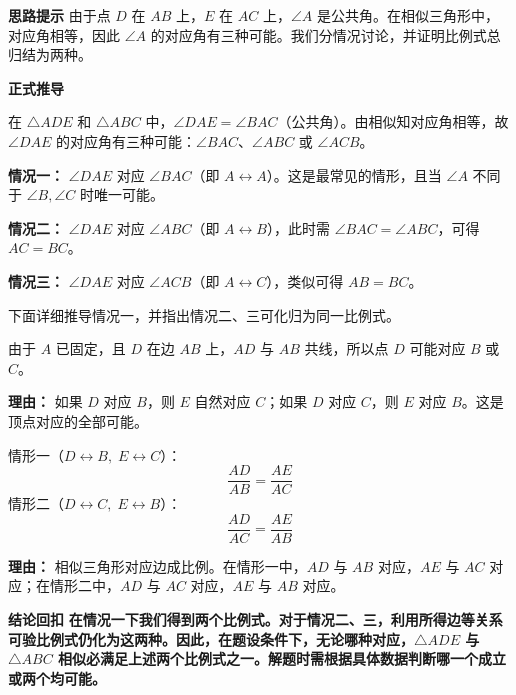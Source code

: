 \begin{proofbox}
	\textbf{\textcolor{CProof}{思路提示}}
	由于点 $D$ 在 $AB$ 上，$E$ 在 $AC$ 上，$\angle A$ 是公共角。在相似三角形中，对应角相等，因此 $\angle A$ 的对应角有三种可能。我们分情况讨论，并证明比例式总归结为两种。

	\medskip
	\textbf{\textcolor{CProof}{正式推导}}
	\begin{description}[style=nextline, leftmargin=2.8em, labelsep=0.5em, itemsep=0.55em]
		\item[\textbf{步骤一（对应角分析）：}]
			在 $\triangle ADE$ 和 $\triangle ABC$ 中，$\angle DAE = \angle BAC$（公共角）。由相似知对应角相等，故 $\angle DAE$ 的对应角有三种可能：$\angle BAC$、$\angle ABC$ 或 $\angle ACB$。
			\par\textbf{情况一：} $\angle DAE$ 对应 $\angle BAC$（即 $A\leftrightarrow A$）。这是最常见的情形，且当 $\angle A$ 不同于 $\angle B,\angle C$ 时唯一可能。
			\par\textbf{情况二：} $\angle DAE$ 对应 $\angle ABC$（即 $A\leftrightarrow B$），此时需 $\angle BAC = \angle ABC$，可得 $AC = BC$。
			\par\textbf{情况三：} $\angle DAE$ 对应 $\angle ACB$（即 $A\leftrightarrow C$），类似可得 $AB = BC$。 \par 下面详细推导情况一，并指出情况二、三可化归为同一比例式。
		\item[\textbf{步骤二（在情况一下分类点 $D$ 的对应）：}]
			由于 $A$ 已固定，且 $D$ 在边 $AB$ 上，$AD$ 与 $AB$ 共线，所以点 $D$ 可能对应 $B$ 或 $C$。
			\par\textbf{理由：} 如果 $D$ 对应 $B$，则 $E$ 自然对应 $C$；如果 $D$ 对应 $C$，则 $E$ 对应 $B$。这是顶点对应的全部可能。
		\item[\textbf{步骤三（列出比例式）：}]
			情形一（$D\leftrightarrow B,\;E\leftrightarrow C$）：
			\[
				\frac{AD}{AB} = \frac{AE}{AC}
			\]
			情形二（$D\leftrightarrow C,\;E\leftrightarrow B$）：
			\[
				\frac{AD}{AC} = \frac{AE}{AB}
			\]
			\par\textbf{理由：} 相似三角形对应边成比例。在情形一中，$AD$ 与 $AB$ 对应，$AE$ 与 $AC$ 对应；在情形二中，$AD$ 与 $AC$ 对应，$AE$ 与 $AB$ 对应。
	\end{description}

	\medskip
	\textbf{\textcolor{CProof}{结论回扣}}
	\textbf{在情况一下我们得到两个比例式。对于情况二、三，利用所得边等关系可验比例式仍化为这两种。因此，在题设条件下，无论哪种对应，$\triangle ADE$ 与 $\triangle ABC$ 相似必满足上述两个比例式之一。解题时需根据具体数据判断哪一个成立或两个均可能。}
\end{proofbox}
